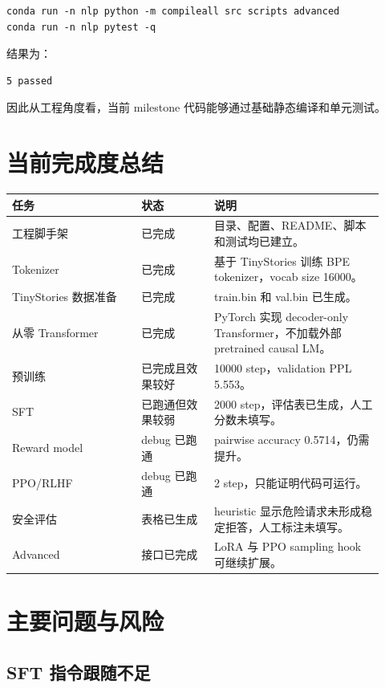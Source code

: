\documentclass[UTF8,zihao=-4]{ctexart}
\begin{document}
\begin{lstlisting}
conda run -n nlp python -m compileall src scripts advanced
conda run -n nlp pytest -q
\end{lstlisting}

结果为：

\begin{lstlisting}
5 passed
\end{lstlisting}

因此从工程角度看，当前 milestone 代码能够通过基础静态编译和单元测试。

\section{当前完成度总结}

\begin{longtable}{>{\raggedright\arraybackslash}p{0.32\linewidth}p{0.18\linewidth}p{0.42\linewidth}}
\toprule
\textbf{任务} & \textbf{状态} & \textbf{说明} \\
\midrule
工程脚手架 & 已完成 & 目录、配置、README、脚本和测试均已建立。\\
Tokenizer & 已完成 & 基于 TinyStories 训练 BPE tokenizer，vocab size 16000。\\
TinyStories 数据准备 & 已完成 & train.bin 和 val.bin 已生成。\\
从零 Transformer & 已完成 & PyTorch 实现 decoder-only Transformer，不加载外部 pretrained causal LM。\\
预训练 & 已完成且效果较好 & 10000 step，validation PPL 5.553。\\
SFT & 已跑通但效果较弱 & 2000 step，评估表已生成，人工分数未填写。\\
Reward model & debug 已跑通 & pairwise accuracy 0.5714，仍需提升。\\
PPO/RLHF & debug 已跑通 & 2 step，只能证明代码可运行。\\
安全评估 & 表格已生成 & heuristic 显示危险请求未形成稳定拒答，人工标注未填写。\\
Advanced & 接口已完成 & LoRA 与 PPO sampling hook 可继续扩展。\\
\bottomrule
\end{longtable}

\section{主要问题与风险}

\subsection{SFT 指令跟随不足}
\end{document}
